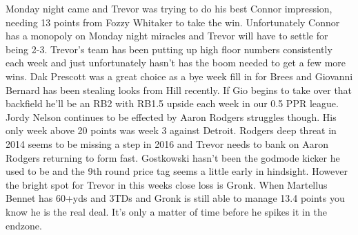 \documentclass[11pt,letterpaper]{article}
\begin{document}
\par\noindent Monday night came and Trevor was trying to do his best Connor impression, needing 13 points from Fozzy Whitaker to take the win. Unfortunately Connor has a monopoly on Monday night miracles and Trevor will have to settle for being 2-3. Trevor's team has been putting up high floor numbers consistently each week and just unfortunately hasn't has the boom needed to get a few more wins. Dak Prescott was a great choice as a bye week fill in for Brees and Giovanni Bernard has been stealing looks from Hill recently. If Gio begins to take over that backfield he'll be an RB2 with RB1.5 upside each week in our 0.5 PPR league. Jordy Nelson continues to be effected by Aaron Rodgers struggles though. His only week above 20 points was week 3 against Detroit. Rodgers deep threat in 2014 seems to be missing a step in 2016 and Trevor needs to bank on Aaron Rodgers returning to form fast. Gostkowski hasn't been the godmode kicker he used to be and the 9th round price tag seems a little early in hindsight. However the bright spot for Trevor in this weeks close loss is Gronk. When Martellus Bennet has 60+yds and 3TDs and Gronk is still able to manage 13.4 points you know he is the real deal. It's only a matter of time before he spikes it in the endzone.
\end{document}
